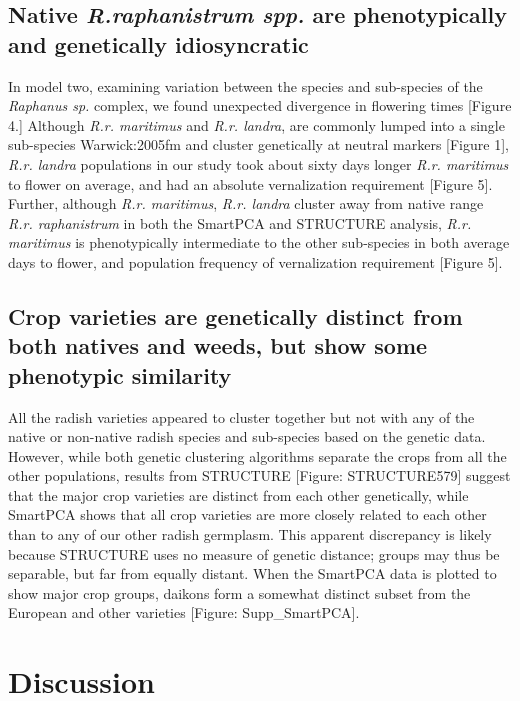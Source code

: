 \documentclass[twocolumn]{bmcart}%
\begin{document}
\subsection*{Native \textit{R.raphanistrum spp.} are phenotypically and genetically idiosyncratic}

In model two, examining variation between the species and sub-species of the \textit{Raphanus sp.} complex, we found unexpected divergence in flowering times [Figure 4.] Although \textit{R.r. maritimus} and \textit{R.r. landra}, are commonly lumped into a single sub-species {Warwick:2005fm} and cluster genetically at neutral markers [Figure 1], \textit{R.r. landra} populations in our study took about sixty days longer \textit{R.r. maritimus} to flower on average, and had an absolute vernalization requirement [Figure 5]. Further, although \textit{R.r. maritimus}, \textit{R.r. landra} cluster away from native range \textit{R.r. raphanistrum} in both the SmartPCA and STRUCTURE analysis, \textit{R.r. maritimus} is phenotypically intermediate to the other sub-species in both average days to flower, and population frequency of vernalization requirement [Figure 5].

\subsection*{Crop varieties are genetically distinct from both natives and weeds, but show some phenotypic similarity}

All the radish varieties appeared to cluster together but not with any of the native or non-native radish species and sub-species based on the genetic data. However, while both genetic clustering algorithms separate the crops from all the other populations, results from STRUCTURE [Figure: STRUCTURE579] suggest that the major crop varieties are distinct from each other genetically, while SmartPCA shows that all crop varieties are more closely related to each other than to any of our other radish germplasm. This apparent discrepancy is likely because STRUCTURE uses no measure of genetic distance; groups may thus be separable, but far from equally distant. When the SmartPCA data is plotted to show major crop groups, daikons form a somewhat distinct subset from the European and other varieties [Figure: Supp\_SmartPCA].

\section*{Discussion}
\end{document}
